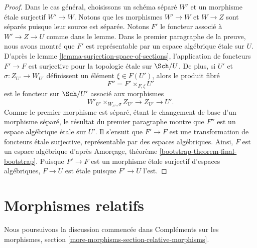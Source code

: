 \begin{proof}
\medskip\noindent
Dans le cas général, choisissons un schéma séparé $W'$ et un morphisme
étale surjectif $W' \to W$. Notons que les morphismes $W' \to W$ et
$W \to Z$ sont séparés puisque leur source est séparée. Notons $F'$ le
foncteur associé à $W' \to Z \to U$ comme dans le lemme. Dans le premier
paragraphe de la preuve, nous avons montré que $F'$ est représentable par un
espace algébrique étale sur $U$. D'après le
lemme \ref{lemma-surjection-space-of-sections},
l'application de foncteurs $F' \to F$ est surjective pour la topologie étale
sur $\Sch/U$. De plus, si $U'$ et $\sigma : Z_{U'} \to W_{U'}$
définissent un élément $\xi \in F(U')$, alors le produit fibré
$$
F'' = F' \times_{F, \xi} U'
$$
est le foncteur sur $\Sch/U'$ associé aux morphismes
$$
W'_{U'} \times_{W_{U'}, \sigma} Z_{U'} \to Z_{U'} \to U'.
$$
Comme le premier morphisme est séparé, étant le changement de base d'un morphisme
séparé, le résultat du premier paragraphe montre que $F''$ est un espace algébrique étale sur $U'$.
Il s'ensuit que $F' \to F$ est une transformation de foncteurs
étale surjective, représentable par des espaces algébriques. Ainsi,
$F$ est un espace algébrique d'après
Amorçage, théorème \ref{bootstrap-theorem-final-bootstrap}.
Puisque $F' \to F$ est un morphisme étale surjectif d'espaces algébriques,
$F \to U$ est étale puisque $F' \to U$ l'est.
\end{proof}









\section{Morphismes relatifs}
\label{section-relative-morphisms}

\noindent
Nous poursuivons la discussion commencée dans
Compléments sur les morphismes, section \ref{more-morphisms-section-relative-morphisms}.

